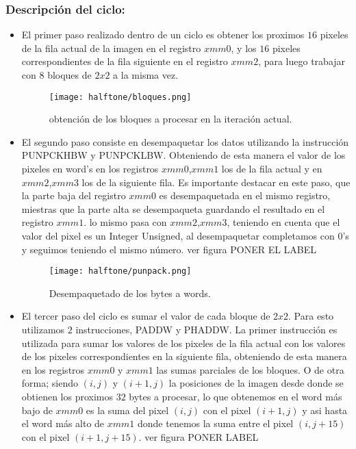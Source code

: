 \subsubsection{Descripción del ciclo:}

\begin{itemize}
	\item El primer paso realizado dentro de un ciclo es obtener los proximos $16$ pixeles de la fila actual de la imagen en el registro $xmm0$, y los $16$ pixeles correspondientes de la fila siguiente en el registro $xmm2$, para luego trabajar con $8$ bloques de $2x2$ a la misma vez. 

	\begin{figure}[H]
		\centering
		\texttt{[image: halftone/bloques.png]}
		\caption{obtención de los bloques a procesar en la iteración actual.}
		\label{bloques}
	\end{figure}

	\item El segundo paso consiste en desempaquetar los datos utilizando la instrucción PUNPCKHBW y PUNPCKLBW. Obteniendo de esta manera el valor de los pixeles en word's en los registros $xmm0$,$xmm1$ los de la fila actual y en $xmm2$,$xmm3$ los de la siguiente fila.
	Es importante destacar en este paso, que la parte baja del registro $xmm0$ es desempaquetada en el mismo registro, miestras que la parte alta se desempaqueta guardando el resultado en el registro $xmm1$. lo mismo pasa con $xmm2$,$xmm3$, teniendo en cuenta que el valor del pixel es un Integer Unsigned, al desempaquetar completamos con $0$'s y seguimos teniendo el mismo número. ver figura PONER EL LABEL

	\begin{figure}[H]
		\centering
		\texttt{[image: halftone/punpack.png]}
		\caption{Desempaquetado de los bytes a words.}
		\label{PUNPCK}
	\end{figure}

	\item El tercer paso del ciclo es sumar el valor de cada bloque de $2x2$. Para esto utilizamos $2$ instrucciones, PADDW y PHADDW. La primer instrucción es utilizada para sumar los valores de los pixeles de la fila actual con los valores de los pixeles correspondientes en la siguiente fila, obteniendo de esta manera en los registros $xmm0$ y $xmm1$ las sumas parciales de los bloques. O de otra forma; siendo $(i,j)$ y $(i+1,j)$ la posiciones de la imagen desde donde se obtienen los proximos $32$ bytes a procesar, lo que obtenemos en el word más bajo de $xmm0$ es la suma del pixel $(i,j)$ con el pixel $(i+1,j)$ y asi hasta el word más alto de $xmm1$ donde tenemos la suma entre el pixel $(i,j+15)$ con el pixel $(i+1,j+15)$. ver figura PONER LABEL


\end{itemize}
